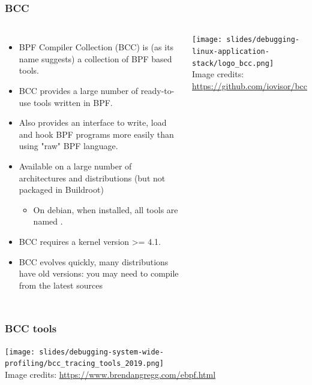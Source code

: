 \begin{frame}[fragile]
  \frametitle{BCC}
  \begin{columns}
    \begin{itemize}
      \item BPF Compiler Collection (BCC) is (as its name suggests) a collection
            of BPF based tools.
      \item BCC provides a large number of ready-to-use tools written in BPF.
      \item Also provides an interface to write, load and hook BPF programs more
            easily than using "raw" BPF language.
      \item Available on a large number of architectures and distributions
	      (but not packaged in Buildroot)
      \begin{itemize}
        \item On debian, when installed, all tools are named .
      \end{itemize}
      \item BCC requires a kernel version >= 4.1.
      \item BCC evolves quickly, many distributions have old versions: you
            may need to compile from the latest sources
    \end{itemize}
  \vspace{0.5cm}
  \texttt{[image: slides/debugging-linux-application-stack/logo\_bcc.png]}\\
  \tiny Image credits: \url{https://github.com/iovisor/bcc}
  \end{columns}
\end{frame}

\begin{frame}[fragile]
  \frametitle{BCC tools}
  \begin{center}
    \texttt{[image: slides/debugging-system-wide-profiling/bcc\_tracing\_tools\_2019.png]}\\
    \tiny Image credits: \url{https://www.brendangregg.com/ebpf.html}
  \end{center}
\end{frame}

